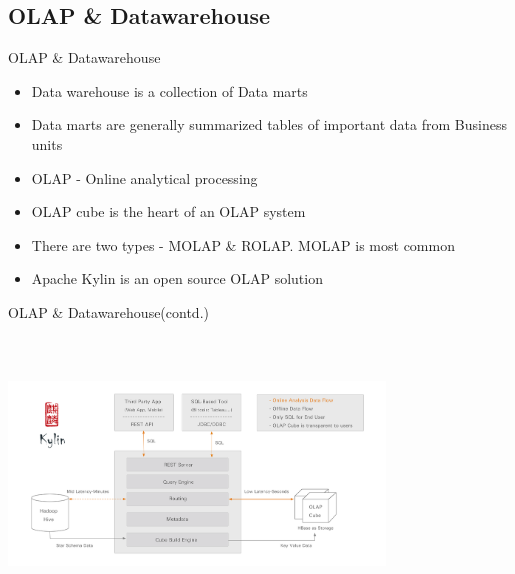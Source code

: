 \documentclass{beamer}
\begin{document}
\subsection{OLAP \& Datawarehouse}
\begin{frame}{OLAP \& Datawarehouse}
	\begin{itemize}
		\item Data warehouse is a collection of Data marts
		\item Data marts are generally summarized tables of important data from Business units
		\item OLAP  - Online analytical processing
		\item OLAP cube is the heart of an OLAP system
		\item There are two types - MOLAP \& ROLAP. MOLAP is most common
		\item Apache Kylin is an open source OLAP solution
	\end{itemize}
\end{frame}

\begin{frame}{OLAP \& Datawarehouse(contd.)}
		\includegraphics[width=10cm,height=8cm]{figures/kylin_diagram.png}
\end{frame}
\end{document}
